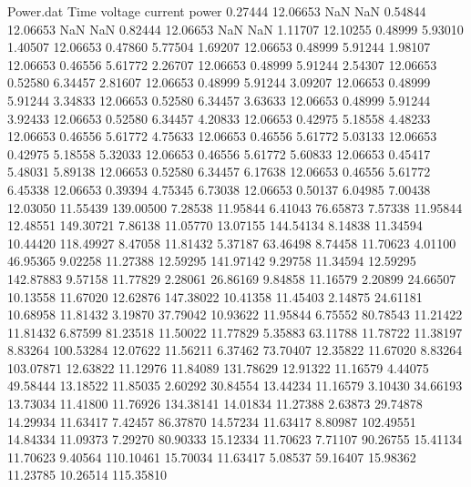 \begin{filecontents}{Power.dat}
Time voltage current power
   0.27444   12.06653        NaN        NaN
   0.54844   12.06653        NaN        NaN
   0.82444   12.06653        NaN        NaN
   1.11707   12.10255    0.48999    5.93010
   1.40507   12.06653    0.47860    5.77504
   1.69207   12.06653    0.48999    5.91244
   1.98107   12.06653    0.46556    5.61772
   2.26707   12.06653    0.48999    5.91244
   2.54307   12.06653    0.52580    6.34457
   2.81607   12.06653    0.48999    5.91244
   3.09207   12.06653    0.48999    5.91244
   3.34833   12.06653    0.52580    6.34457
   3.63633   12.06653    0.48999    5.91244
   3.92433   12.06653    0.52580    6.34457
   4.20833   12.06653    0.42975    5.18558
   4.48233   12.06653    0.46556    5.61772
   4.75633   12.06653    0.46556    5.61772
   5.03133   12.06653    0.42975    5.18558
   5.32033   12.06653    0.46556    5.61772
   5.60833   12.06653    0.45417    5.48031
   5.89138   12.06653    0.52580    6.34457
   6.17638   12.06653    0.46556    5.61772
   6.45338   12.06653    0.39394    4.75345
   6.73038   12.06653    0.50137    6.04985
   7.00438   12.03050   11.55439  139.00500
   7.28538   11.95844    6.41043   76.65873
   7.57338   11.95844   12.48551  149.30721
   7.86138   11.05770   13.07155  144.54134
   8.14838   11.34594   10.44420  118.49927
   8.47058   11.81432    5.37187   63.46498
   8.74458   11.70623    4.01100   46.95365
   9.02258   11.27388   12.59295  141.97142
   9.29758   11.34594   12.59295  142.87883
   9.57158   11.77829    2.28061   26.86169
   9.84858   11.16579    2.20899   24.66507
  10.13558   11.67020   12.62876  147.38022
  10.41358   11.45403    2.14875   24.61181
  10.68958   11.81432    3.19870   37.79042
  10.93622   11.95844    6.75552   80.78543
  11.21422   11.81432    6.87599   81.23518
  11.50022   11.77829    5.35883   63.11788
  11.78722   11.38197    8.83264  100.53284
  12.07622   11.56211    6.37462   73.70407
  12.35822   11.67020    8.83264  103.07871
  12.63822   11.12976   11.84089  131.78629
  12.91322   11.16579    4.44075   49.58444
  13.18522   11.85035    2.60292   30.84554
  13.44234   11.16579    3.10430   34.66193
  13.73034   11.41800   11.76926  134.38141
  14.01834   11.27388    2.63873   29.74878
  14.29934   11.63417    7.42457   86.37870
  14.57234   11.63417    8.80987  102.49551
  14.84334   11.09373    7.29270   80.90333
  15.12334   11.70623    7.71107   90.26755
  15.41134   11.70623    9.40564  110.10461
  15.70034   11.63417    5.08537   59.16407
  15.98362   11.23785   10.26514  115.35810

\end{filecontents}
